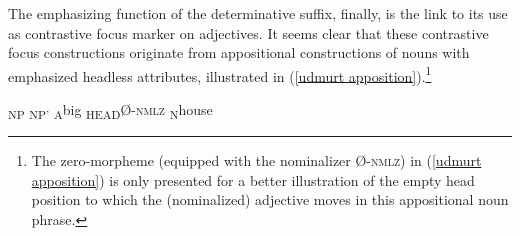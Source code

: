 The emphasizing function of the determinative suffix, finally, is the link to its use as contrastive focus marker on adjectives. It seems clear that these contrastive focus constructions originate from appositional constructions of nouns with emphasized headless attributes, illustrated in (\ref{udmurt apposition}).\footnote{The zero-morpheme (equipped with the nominalizer Ø-\textsc{nmlz}) in (\ref{udmurt apposition}) is only presented for a better illustration of the empty head position to which the (nominalized) adjective moves in this appositional noun phrase.}
 

\begin{exe}
\ex {\ob}\textsubscript{\upshape NP} {\ob}\textsubscript{\upshape NP'} \textsubscript{\upshape A}big \textsubscript{\upshape HEAD}Ø-\textsc{\upshape nmlz}{\cb} \textsubscript{\upshape N}house{\cb}
\label{udmurt apposition}
\end{exe}


